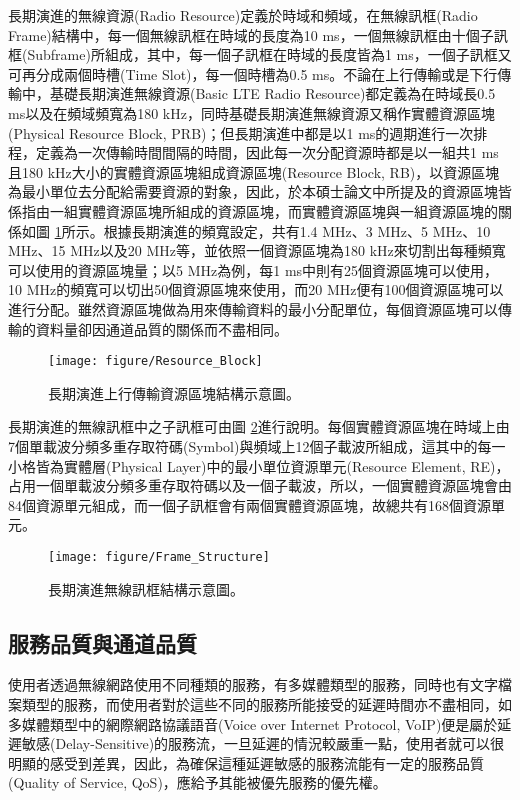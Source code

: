 長期演進的無線資源(Radio Resource)定義於時域和頻域\cite{PHY_Channel_spec}，在無線訊框(Radio Frame)結構中，每一個無線訊框在時域的長度為10 ms，一個無線訊框由十個子訊框(Subframe)所組成，其中，每一個子訊框在時域的長度皆為1 ms，一個子訊框又可再分成兩個時槽(Time Slot)，每一個時槽為0.5 ms。不論在上行傳輸或是下行傳輸中，基礎長期演進無線資源(Basic LTE Radio Resource)都定義為在時域長0.5 ms以及在頻域頻寬為180 kHz，同時基礎長期演進無線資源又稱作實體資源區塊(Physical Resource Block, PRB)\cite{abu2014uplink}；但長期演進中都是以1 ms的週期進行一次排程，定義為一次傳輸時間間隔的時間，因此每一次分配資源時都是以一組共1 ms且180 kHz大小的實體資源區塊組成資源區塊(Resource Block, RB)，以資源區塊為最小單位去分配給需要資源的對象，因此，於本碩士論文中所提及的資源區塊皆係指由一組實體資源區塊所組成的資源區塊，而實體資源區塊與一組資源區塊的關係如圖 \ref{fig:Resource_Block}所示。根據長期演進的頻寬設定，共有1.4 MHz、3 MHz、5 MHz、10 MHz、15 MHz以及20 MHz等，並依照一個資源區塊為180 kHz來切割出每種頻寬可以使用的資源區塊量；以5 MHz為例，每1 ms中則有25個資源區塊可以使用，10 MHz的頻寬可以切出50個資源區塊來使用，而20 MHz便有100個資源區塊可以進行分配。雖然資源區塊做為用來傳輸資料的最小分配單位，每個資源區塊可以傳輸的資料量卻因通道品質的關係而不盡相同。
\vskip 20pt
\begin{figure}[H]
\centering
\texttt{[image: figure/Resource\_Block]}
\caption{\label{fig:Resource_Block}長期演進上行傳輸資源區塊結構示意圖。}
\end{figure}

長期演進的無線訊框中之子訊框可由圖 \ref{fig:Frame_Structure}進行說明。每個實體資源區塊在時域上由7個單載波分頻多重存取符碼(Symbol)與頻域上12個子載波所組成\cite{damn2011}，這其中的每一小格皆為實體層(Physical Layer)中的最小單位資源單元(Resource Element, RE)，占用一個單載波分頻多重存取符碼以及一個子載波，所以，一個實體資源區塊會由84個資源單元組成，而一個子訊框會有兩個實體資源區塊，故總共有168個資源單元。
\vskip 20pt
\begin{figure}[H]
\texttt{[image: figure/Frame\_Structure]}
\caption 
{\label{fig:Frame_Structure}長期演進無線訊框結構示意圖。}
\end{figure}

\subsection{服務品質與通道品質}
使用者透過無線網路使用不同種類的服務，有多媒體類型的服務，同時也有文字檔案類型的服務，而使用者對於這些不同的服務所能接受的延遲時間亦不盡相同，如多媒體類型中的網際網路協議語音(Voice over Internet Protocol, VoIP)便是屬於延遲敏感(Delay-Sensitive)的服務流，一旦延遲的情況較嚴重一點，使用者就可以很明顯的感受到差異，因此，為確保這種延遲敏感的服務流能有一定的服務品質(Quality of Service, QoS)，應給予其能被優先服務的優先權。

